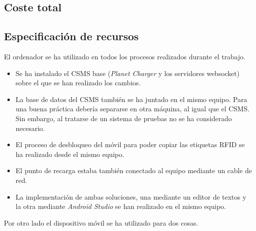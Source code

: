 \documentclass[12pt,a4paper,onecolumn,oneside]{report}
\begin{document}
\subsection{Coste total}

\begin{table}[ht]
	\centering
	\caption{Presupuesto total}
	\label{tabla3}
\end{table}

\subsection{Especificación de recursos}

El ordenador se ha utilizado en todos los procesos realizados durante el trabajo.

\begin{itemize}
\item Se ha instalado el CSMS base (\textit{Planet Charger} y los servidores websocket) sobre el que se han realizado los cambios.
\item La base de datos del CSMS también se ha juntado en el mismo equipo. Para una buena práctica debería separarse en otra máquina, al igual que el CSMS. Sin embargo, al tratarse de un sistema de pruebas no se ha considerado necesario.
\item El proceso de desbloqueo del móvil para poder copiar las etiquetas RFID se ha realizado desde el mismo equipo.
\item El punto de recarga estaba también conectado al equipo mediante un cable de red.
\item La implementación de ambas soluciones, una mediante un editor de textos y la otra mediante \textit{Android Studio} se han realizado en el mismo equipo.
\end{itemize}

Por otro lado el dispositivo móvil se ha utilizado para dos cosas.
\end{document}
